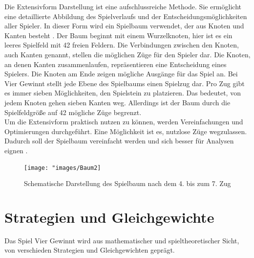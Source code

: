 Die Extensivform Darstellung ist eine aufschlussreiche Methode.
Sie ermöglicht eine detaillierte Abbildung des Spielverlaufs und der Entscheidungsmöglichkeiten aller Spieler.
In dieser Form wird ein Spielbaum verwendet, der aus Knoten und Kanten besteht \autocite{einsiedler2014spieltheorie}. 
Der Baum beginnt mit einem Wurzelknoten, hier ist es ein leeres Spielfeld mit 42 freien Feldern. Die Verbindungen zwischen den Knoten, auch Kanten genannt, stellen die möglichen Züge für den Spieler dar. Die Knoten, an denen Kanten zusammenlaufen, repräsentieren eine Entscheidung eines Spielers. Die Knoten am Ende zeigen mögliche Ausgänge für das Spiel an.
Bei Vier Gewinnt stellt jede Ebene des Spielbaums einen Spielzug dar. Pro Zug gibt es immer sieben Möglichkeiten, den Spielstein zu platzieren. Das bedeutet, von jedem Knoten gehen sieben Kanten weg. Allerdings ist der Baum durch die Spielfeldgröße auf 42 mögliche Züge begrenzt.\\
Um die Extensivform praktisch nutzen zu können, werden Vereinfachungen und Optimierungen durchgeführt. Eine Möglichkeit ist es, nutzlose Züge wegzulassen. Dadurch soll der Spielbaum vereinfacht werden und sich besser für Analysen eignen \autocite{ruile2009viergewinnt}.  

\begin{figure}[H]
	\centering
	\texttt{[image: "images/Baum2]}
	\caption[Spielbaum nach dem 4. Zug. Quelle: ]{Schematische Darstellung des Spielbaum nach dem 4. bis zum 7. Zug  \autocite{vandewiele2017}}
	\label{fig:Baum2}
\end{figure}

\section{Strategien und Gleichgewichte}
Das Spiel Vier Gewinnt wird aus mathematischer und spieltheoretischer Sicht, von verschieden Strategien und Gleichgewichten geprägt.

